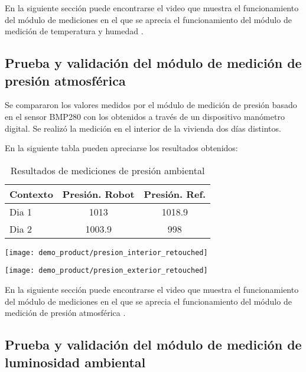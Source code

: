 En la siguiente sección puede encontrarse el video que muestra el funcionamiento del módulo de mediciones en el que se aprecia el funcionamiento del módulo de medición de temperatura y humedad \cite{Demo_Mediciones}.

\subsection{Prueba y validación del módulo de medición de presión atmosférica}

Se compararon los valores medidos por el módulo de medición de presión basado en el sensor BMP280 con los obtenidos a través de un dispositivo manómetro digital. Se realizó la medición en el interior de la vivienda dos días distintos.

En la siguiente tabla pueden apreciarse los resultados obtenidos:

\begin{table}[h]
\centering
\caption[Resultados de mediciones de presión ambiental]{Resultados de mediciones de presión ambiental}
\begin{tabular}{l c c}
\toprule
\textbf{Contexto} & \textbf{Presión. Robot} & \textbf{Presión. Ref.} \\
\midrule
Dia 1 & 1013 & 1018.9 \\
Dia 2 & 1003.9 & 998 \\
\bottomrule
\hline
\end{tabular}
\end{table}

\begin{center}
\texttt{[image: demo\_product/presion\_interior\_retouched]}
  \label{fig:humedad_interior}
\end{center}

\begin{center}
\texttt{[image: demo\_product/presion\_exterior\_retouched]}
  \label{fig:humedad_interior}
\end{center}

En la siguiente sección puede encontrarse el video que muestra el funcionamiento del módulo de mediciones en el que se aprecia el funcionamiento del módulo de medición de presión atmosférica \cite{Demo_Mediciones}.

\subsection{Prueba y validación del módulo de medición de luminosidad ambiental}

